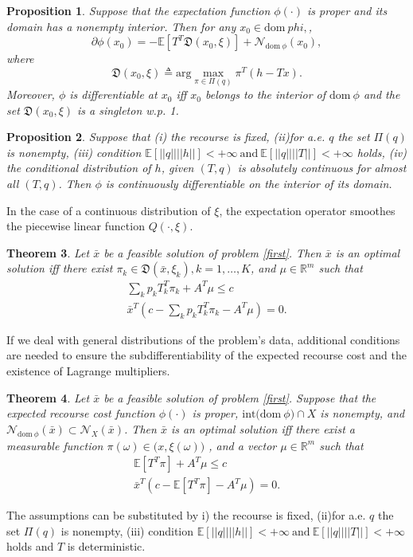 \documentclass[a4pper,11pt]{article}
\newtheorem{thm}{Theorem}[section]
\newtheorem{prop}[thm]{Proposition}
\begin{document}
\begin{prop}
Suppose that the expectation function $\phi(\cdot)$ is proper and its domain has a nonempty interior. Then for any $x_0\in \text{dom}\ phi,$,
$$\partial \phi(x_0)=-\mathbb E[T^T\mathfrak D(x_0,\xi)]+\mathcal N_{\text{dom}\ \phi} (x_0),$$
where
$$\mathfrak D(x_0,\xi) \triangleq \text{arg}\max_{\pi\in \Pi(q)}\pi^T(h-Tx).$$
Moreover, $\phi$ is differentiable at $x_0$ iff $x_0$ belongs to the interior of $\text{dom} \ \phi$ and the set $\mathfrak D(x_0,\xi)$ is a singleton w.p. 1.
\end{prop}
\begin{prop}
Suppose that (i) the recourse is ﬁxed, (ii)for a.e. $q$ the set $\Pi(q)$ is nonempty, (iii) condition $\mathbb E[||q||||h||]<+\infty \ \text{and} \ \mathbb E[||q||||T||]<+\infty$ holds, (iv) the conditional distribution of $h$, given $(T,q)$ is absolutely continuous for almost all $(T,q)$. Then $\phi$ is continuously differentiable on the interior of its domain.
\end{prop}
In the case of a continuous distribution of $\xi$, the expectation operator smoothes the piecewise linear function $Q(\cdot, \xi)$.

\begin{thm}
Let $\bar x$ be a feasible solution of problem \eqref{first}. Then $\bar x$ is an optimal solution iff there exist $\pi_k \in\mathfrak D(\bar x,\xi_k), k=1,\dots, K$, and $\mu\in \mathbb R^m$ such that
\begin{equation}
\begin{aligned}
\sum_{k} p_kT_k^T\pi_k+A^T\mu\leq c 
\\
\bar x^T(c-\sum_{k} p_kT_k^T\pi_k-A^T\mu)=0.
\end{aligned}
\end{equation}
\end{thm}

If we deal with general distributions of the problem’s data, additional conditions are needed to ensure the subdifferentiability of the expected recourse cost and the existence of Lagrange multipliers.
\begin{thm}
Let $\bar x$ be a feasible solution of problem \eqref{first}. Suppose that the expected recourse cost function $\phi(\cdot)$ is proper, $\text{int(dom}\ \phi) \cap X$ is nonempty, and $\mathcal N_{\text{dom} \ \phi}  (\bar x) \subset \mathcal N_X (\bar x)$. Then $\bar x$ is an optimal solution iff there exist a measurable function $\pi(\omega)\in \mathfrak (x,\xi(\omega))$ , and a vector $\mu\in \mathbb R^m$ such that
\begin{equation}
\begin{aligned}
\mathbb E[T^T\pi]+A^T\mu\leq c
\\
\bar x^T(c-\mathbb E[T^T\pi]-A^T\mu)=0.
\end{aligned}
\end{equation}
\end{thm}

The assumptions can be substituted by i) the recourse is ﬁxed, (ii)for a.e. $q$ the set $\Pi(q)$ is nonempty, (iii) condition $\mathbb E[||q||||h||]<+\infty \ \text{and} \ \mathbb E[||q||||T||]<+\infty$ holds and $T$ is deterministic.
\end{document}

